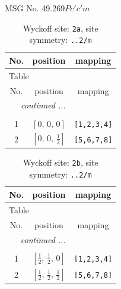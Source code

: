 \documentclass[fleqn,8pt]{jsarticle}
\begin{document}
\setcounter{MaxMatrixCols}{32}

\renewcommand{\tablename}{Table~}
\renewcommand{\figurename}{Figure~}
\begin{center}
\LARGE
MSG No. 49.269\quad$Pc'c'm$
\end{center}
\renewcommand{\arraystretch}{1.2}
\begin{longtable}{ccc}
\caption{Wyckoff site: {\tt 2a}, site symmetry: {\tt ..2/m}}
 \\
 \hline \hline
No. & position & mapping \\ \hline \endfirsthead

\multicolumn{2}{l}{\tablename\ \thetable{}} \\
 \hline \hline
No. & position & mapping \\ \hline \endhead

 \hline \hline
\multicolumn{2}{r}{\footnotesize\it continued ...} \\ \endfoot

 \hline \hline
\multicolumn{2}{r}{} \\ \endlastfoot

1 & $\left[ 0,\, 0,\, 0 \right]$ & {\tt [1,2,3,4]} \\ \hline
2 & $\left[ 0,\, 0,\, \frac{1}{2} \right]$ & {\tt [5,6,7,8]} \\
\end{longtable}
\renewcommand{\arraystretch}{1.2}
\begin{longtable}{ccc}
\caption{Wyckoff site: {\tt 2b}, site symmetry: {\tt ..2/m}}
 \\
 \hline \hline
No. & position & mapping \\ \hline \endfirsthead

\multicolumn{2}{l}{\tablename\ \thetable{}} \\
 \hline \hline
No. & position & mapping \\ \hline \endhead

 \hline \hline
\multicolumn{2}{r}{\footnotesize\it continued ...} \\ \endfoot

 \hline \hline
\multicolumn{2}{r}{} \\ \endlastfoot

1 & $\left[ \frac{1}{2},\, \frac{1}{2},\, 0 \right]$ & {\tt [1,2,3,4]} \\ \hline
2 & $\left[ \frac{1}{2},\, \frac{1}{2},\, \frac{1}{2} \right]$ & {\tt [5,6,7,8]} \\
\end{longtable}
\end{document}
